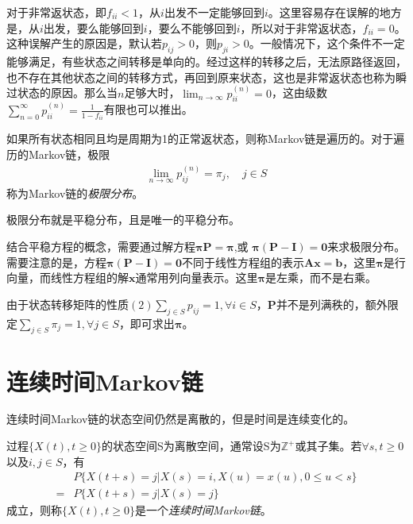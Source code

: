 对于非常返状态，即\(f_{ii}<1\)，从\(i\)出发不一定能够回到\(i\)。这里容易存在误解的地方是，从\(i\)出发，要么能够回到\(i\)，要么不能够回到\(i\)，所以对于非常返状态，\(f_{ii}=0\)。
这种误解产生的原因是，默认若\(p_{ij}>0\)，则\(p_{ji}>0\)。一般情况下，这个条件不一定能够满足，有些状态之间转移是单向的。经过这样的转移之后，无法原路径返回，也不存在其他状态之间的转移方式，再回到原来状态，这也是非常返状态也称为瞬过状态的原因。那么当\(n\)足够大时，\(\lim_{n\to \infty}p_{ii}^{(n)}=0\)，这由级数\(\sum_{n=0}^{\infty}p_{ii}^{(n)}=\frac{1}{1-f_{ii}}\)有限也可以推出。

\begin{definition}\label{defi:limdis}
	如果所有状态相同且均是周期为1的正常返状态，则称Markov链是遍历的。对于遍历的Markov链，极限
	\begin{align*}
		\lim_{n\to \infty}p_{ij}^{(n)}=\pi_j,\quad j\in S
	\end{align*}
	称为Markov链的\emph{极限分布}。
\end{definition}

极限分布就是平稳分布，且是唯一的平稳分布。

结合平稳方程的概念，需要通过解方程\(\boldsymbol{\pi}\mathbf{P}=\boldsymbol{\pi}\),或
\(\boldsymbol{\pi}(\mathbf{P}-\mathbf{I})=\mathbf{0}\)来求极限分布。需要注意的是，方程\(\boldsymbol{\pi}(\mathbf{P}-\mathbf{I})=\mathbf{0}\)不同于线性方程组的表示\(\mathbf{Ax}=\mathbf{b}\)，这里\(\boldsymbol{\pi}\)是行向量，而线性方程组的解\(\mathbf{x}\)通常用列向量表示。这里\(\boldsymbol{\pi}\)是左乘，而不是右乘。

由于状态转移矩阵的性质\((2)\sum_{j\in S}p_{ij}=1,\forall i\in S\)，\(\mathbf{P}\)并不是列满秩的，额外限定\(\sum_{j\in S}\pi_{j}=1,\forall j\in S\)，即可求出\(\boldsymbol{\pi}\)。

\section{连续时间Markov链}

连续时间Markov链的状态空间仍然是离散的，但是时间是连续变化的。

\begin{definition}\label{def:contimemarkov}
	过程\(\{X(t),t\geqslant 0\}\)的状态空间S为离散空间，通常设S为\(\mathbb{Z^+}\)或其子集。若\(\forall s,t\geqslant 0\)以及\(i,j\in S\)，有
	\begin{align*}
		  & P\{X(t+s)=j|X(s)=i,X(u)=x(u),0\leqslant u<s\} \\
		= & P\{X(t+s)=j|X(s)=j\}
	\end{align*}
	成立，则称\(\{X(t),t\geqslant 0\}\)是一个\emph{连续时间Markov链}。
\end{definition}


